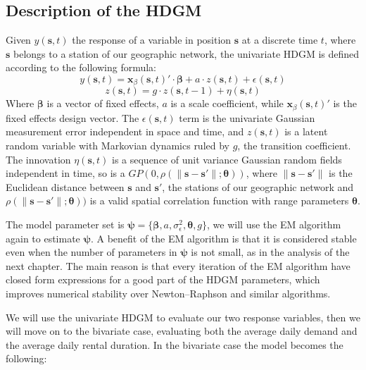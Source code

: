\subsection{Description of the HDGM}
Given $y(\boldsymbol{s},t)$  the response of a variable in position $\boldsymbol{s}$ at a discrete time $t$, where $\boldsymbol{s}$ belongs to a station of our geographic network, the univariate HDGM is defined according to the following formula:
\begin{displaymath}
	y(\boldsymbol{s}, t) = \boldsymbol{x}_\beta(\boldsymbol{s}, t)' \cdot \boldsymbol{\beta} + a \cdot z(\boldsymbol{s}, t) + \epsilon(\boldsymbol{s}, t)
\end{displaymath}
\begin{displaymath}
	z(\boldsymbol{s}, t) = g \cdot z(\boldsymbol{s}, t-1) + \eta(\boldsymbol{s}, t)
\end{displaymath}
Where $\boldsymbol{\beta}$ is a vector of fixed effects, $a$ is a scale coefficient, while $\boldsymbol{x}_\beta(\boldsymbol{s}, t)'$ is the fixed effects design vector. The $\epsilon(\boldsymbol{s}, t)$ term is the univariate Gaussian measurement error independent in space and time, and $z(\boldsymbol{s}, t)$ is a latent random variable with Markovian dynamics ruled by $g$, the transition coefficient. The innovation $\eta(\boldsymbol{s}, t)$ is a sequence of unit variance Gaussian random fields independent in time, so is a $GP(0, \rho(\lVert \boldsymbol{s}-\boldsymbol{s'} \rVert;\boldsymbol{\theta}))$, where $\lVert \boldsymbol{s}-\boldsymbol{s'} \rVert$ is the Euclidean distance between $\boldsymbol{s}$ and $\boldsymbol{s'}$, the stations of our geographic network and $\rho(\lVert \boldsymbol{s}-\boldsymbol{s'} \rVert;\boldsymbol{\theta}))$ is a valid spatial correlation function with range parameters $\boldsymbol{\theta}$. \par The model parameter set is $\boldsymbol{\psi} = \{\boldsymbol{\beta}, a, \sigma_\epsilon^2, \boldsymbol{\theta}, g\}$, we will use the EM algorithm again to estimate $\boldsymbol{\psi}$. A benefit of the EM algorithm is that it is considered stable even when the number of parameters in $\boldsymbol{\psi}$ is not small, as in the analysis of the next chapter. The main reason is that every iteration of the EM algorithm have closed form expressions for a good part of the HDGM parameters, which improves numerical stability over Newton–Raphson and similar algorithms. \par We will use the univariate HDGM to evaluate our two response variables, then we will move on to the bivariate case, evaluating both the average daily demand and the average daily rental duration. In the bivariate case the model becomes the following:
